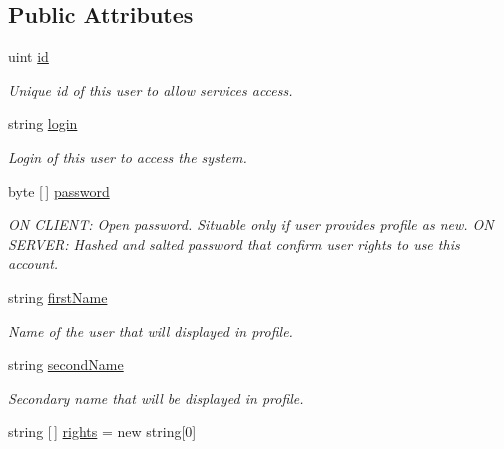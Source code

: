 \subsection*{Public Attributes}
\begin{DoxyCompactItemize}
\item 
uint \mbox{\hyperlink{class_authority_controller_1_1_data_1_1_personal_1_1_user_a1a2ed2d1d844d6c92cc301595488375a}{id}}
\begin{DoxyCompactList}\small\item\em Unique id of this user to allow services access. \end{DoxyCompactList}\item 
string \mbox{\hyperlink{class_authority_controller_1_1_data_1_1_personal_1_1_user_aa0cd14927a55efeafd187ca681bfd62d}{login}}
\begin{DoxyCompactList}\small\item\em Login of this user to access the system. \end{DoxyCompactList}\item 
byte \mbox{[}$\,$\mbox{]} \mbox{\hyperlink{class_authority_controller_1_1_data_1_1_personal_1_1_user_abc14acc6d3441deb742264eb6cfc167c}{password}}
\begin{DoxyCompactList}\small\item\em ON C\+L\+I\+E\+NT\+: Open password. Situable only if user provides profile as new. ON S\+E\+R\+V\+ER\+: Hashed and salted password that confirm user rights to use this account. \end{DoxyCompactList}\item 
string \mbox{\hyperlink{class_authority_controller_1_1_data_1_1_personal_1_1_user_a06913d22f1b4518cce99c356bdad38a0}{first\+Name}}
\begin{DoxyCompactList}\small\item\em Name of the user that will displayed in profile. \end{DoxyCompactList}\item 
string \mbox{\hyperlink{class_authority_controller_1_1_data_1_1_personal_1_1_user_a8b4f88cdbace4ccf3101c6a62dc26a10}{second\+Name}}
\begin{DoxyCompactList}\small\item\em Secondary name that will be displayed in profile. \end{DoxyCompactList}\item 
string \mbox{[}$\,$\mbox{]} \mbox{\hyperlink{class_authority_controller_1_1_data_1_1_personal_1_1_user_a937c23d9fddf843c49a69a6424bfda02}{rights}} = new string\mbox{[}0\mbox{]}

\end{DoxyCompactItemize}
